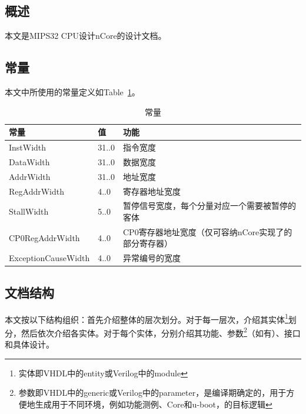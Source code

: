 \documentclass{article}
\begin{document}
\begin{spacing}{1.4}


\section{概述}

本文是MIPS32 CPU设计nCore的设计文档。

\subsection{常量}

本文中所使用的常量定义如Table~\ref{tb:constants}。
\begin{table}[!htb]
\begin{center}
\begin{tabular*}{15cm}{l|l|p{10cm}}  
\hline  
\textbf{常量}&\textbf{值}&\textbf{功能} \\
\hline InstWidth            & 31..0    & 指令宽度 \\
\hline DataWidth            & 31..0    & 数据宽度 \\
\hline AddrWidth            & 31..0    & 地址宽度 \\
\hline RegAddrWidth         & 4..0     & 寄存器地址宽度 \\
\hline StallWidth           & 5..0     & 暂停信号宽度，每个分量对应一个需要被暂停的客体 \\
\hline CP0RegAddrWidth      & 4..0     & CP0寄存器地址宽度（仅可容纳nCore实现了的部分寄存器） \\
\hline ExceptionCauseWidth  & 4..0     & 异常编号的宽度 \\
\hline 
\end{tabular*}  
\caption{常量}
\label{tb:constants}
\end{center}
\end{table}

\subsection{文档结构}

本文按以下结构组织：首先介绍整体的层次划分。对于每一层次，介绍其实体\footnote{实体即VHDL中的entity或Verilog中的module}划分，然后依次介绍各实体。对于每个实体，分别介绍其功能、参数\footnote{参数即VHDL中的generic或Verilog中的parameter，是编译期确定的，用于方便地生成用于不同环境，例如功能测例、\textmu Core和u-boot，的目标逻辑}（如有）、接口和具体设计。


\end{spacing}
\end{document}
